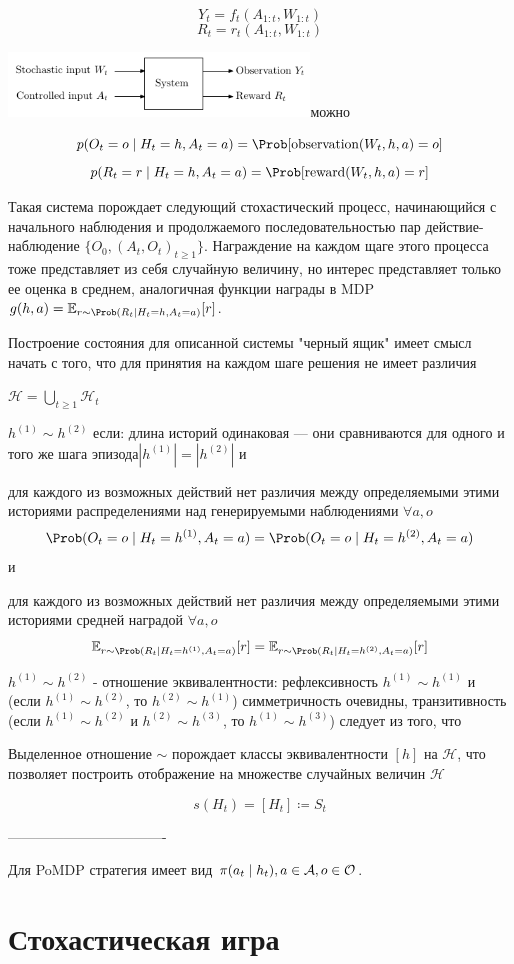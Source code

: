 \documentclass[../main.tex]{subfiles}
\begin{document}
$$Y_t = f_t(A_{1:t}, W_{1:t})$$
$$R_t = r_t(A_{1:t}, W_{1:t})$$
 

\includegraphics[width=0.6\textwidth]{Images/stochastic_io_system.png}можно

$$p(O_t=o \mid H_t=h, A_t=a) = \Prob[\text{observation}(W_t,h,a)=o] $$
$$p(R_t=r \mid H_t=h, A_t=a) = \Prob[\text{reward}(W_t,h,a)=r] $$

Такая система порождает следующий стохастический процесс, начинающийся с начального наблюдения и продолжаемого последовательностью пар действие-наблюдение $\{O_0, (A_t, O_t)_{t \geq 1}\}$. Награждение на каждом щаге этого процесса тоже представляет из себя случайную величину, но интерес представляет только ее оценка в среднем, аналогичная функции награды в MDP $g(h,a) = \E_{r \sim \Prob(R_t \mid H_t=h, A_t=a)} [r]$.

Построение состояния для описанной системы "черный ящик" имеет смысл начать с того, что для принятия на каждом шаге решения не имеет различия

$\mathcal{H} = \bigcup_{t \geq 1} \mathcal{H}_t$

$h^{(1)} \sim h^{(2)}$ если:
длина историй одинаковая --- они сравниваются для одного и того же шага эпизода$|h^{(1)}|=|h^{(2)}|$ и 

для каждого из возможных действий нет различия между определяемыми этими историями распределениями над генерируемыми наблюдениями $\forall a,o$ $$\Prob(O_t=o \mid H_t=h^{(1)}, A_t=a)=\Prob(O_t=o \mid H_t=h^{(2)}, A_t=a)$$ и

для каждого из возможных действий нет различия между определяемыми этими историями средней наградой $\forall a,o$
 $$\E_{r \sim \Prob(R_t \mid H_t=h^{(1)}, A_t=a)} [r] = \E_{r \sim \Prob(R_t \mid H_t=h^{(2)}, A_t=a)} [r] $$



$h^{(1)} \sim h^{(2)}$ - отношение эквивалентности:
рефлексивность $h^{(1)} \sim h^{(1)}$ и (если $h^{(1)} \sim h^{(2)}$, то $h^{(2)} \sim h^{(1)}$) симметричность очевидны, 
транзитивность (если $h^{(1)} \sim h^{(2)}$ и $h^{(2)} \sim h^{(3)}$, то $h^{(1)} \sim h^{(3)}$) следует из того, что 

Выделенное отношение $\sim$ порождает классы эквивалентности $[h]$ на $\mathcal{H}$, что позволяет построить отображение на множестве случайных величин $\mathcal{H}$

 $$s(H_t)=[H_t] \coloneqq S_t $$ 


----------------------------------

Для PoMDP стратегия имеет вид $\pi(a_t \mid h_t), a \HM\in \A, o \HM\in \mathcal{O}$.

\section{Стохастическая игра}
\end{document}
